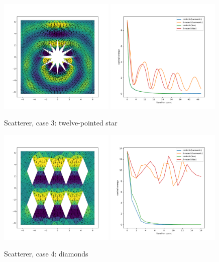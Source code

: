 \documentclass[utf8,english]{gradu3}
\begin{document}
\begin{figure}[H]
  \includegraphics[width=0.49\textwidth]{thesis/scatterer_star_12_solution.pdf}
  \includegraphics[width=0.49\textwidth]{thesis/scatterer_star_12_convergence.pdf}
  \caption{Scatterer, case 3: twelve-pointed star}
  \label{fig:scatterer_star_12}
\end{figure}

\begin{figure}[H]
  \includegraphics[width=0.49\textwidth]{thesis/scatterer_diamonds_solution.pdf}
  \includegraphics[width=0.49\textwidth]{thesis/scatterer_diamonds_convergence.pdf}
  \caption{Scatterer, case 4: diamonds}
  \label{fig:scatterer_diamonds}
\end{figure}
\end{document}
